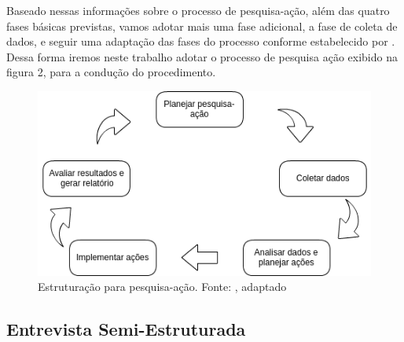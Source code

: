 Baseado nessas informações sobre o processo de pesquisa-ação, além das quatro fases básicas previstas, vamos adotar mais uma fase adicional, a fase de coleta de dados, e seguir uma adaptação das fases do processo conforme estabelecido por . Dessa forma iremos neste trabalho adotar o processo de pesquisa ação exibido na figura 2, para a condução do procedimento.

\begin{figure}[!htb]
	\centering
	\includegraphics[scale=0.6]{figuras/estruturacao_pesquisa_acao}
	\caption{Estruturação para pesquisa-ação. Fonte: \cite{coughlan2002action}, adaptado}
\end{figure}

\newpage

\subsection{Entrevista Semi-Estruturada}

